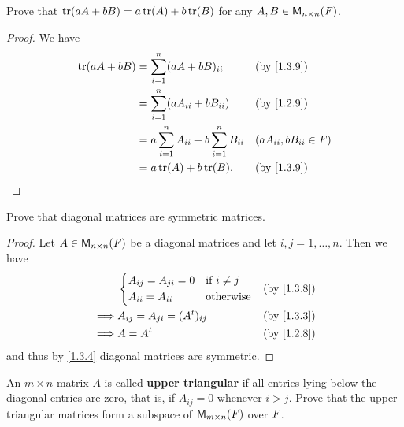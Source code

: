 \begin{ex}\label{ex:1.3.6}
  Prove that \(\tr{aA + bB} = a\tr{A} + b\tr{B}\) for any \(A, B \in \mathsf{M}_{{n} \times n}({\mathit{F}})\).
\end{ex}

\begin{proof}
  We have
  \begin{align*}
    \tr{aA + bB} & = \sum_{i = 1}^n (aA + bB)_{i i}                      &  & \text{(by \cref{1.3.9})}    \\
                 & = \sum_{i = 1}^n (aA_{i i} + bB_{i i})                &  & \text{(by \cref{1.2.9})}    \\
                 & = a \sum_{i = 1}^n A_{i i} + b \sum_{i = 1}^n B_{i i} &  & (aA_{i i}, bB_{i i} \in \F) \\
                 & = a\tr{A} + b\tr{B}.                                  &  & \text{(by \cref{1.3.9})}
  \end{align*}
\end{proof}

\begin{ex}\label{ex:1.3.7}
  Prove that diagonal matrices are symmetric matrices.
\end{ex}

\begin{proof}
  Let \(A \in \mathsf{M}_{{n} \times n}({\mathit{F}})\) be a diagonal matrices and let \(i, j = 1, \dots, n\).
  Then we have
  \begin{align*}
             & \begin{dcases}
      A_{i j} = A_{j i} = 0 & \text{if } i \neq j \\
      A_{i i} = A_{i i}     & \text{otherwise}
    \end{dcases}         &  & \text{(by \cref{1.3.8})} \\
    \implies & A_{i j} = A_{j i} = (\tp{A})_{i j} &  & \text{(by \cref{1.3.3})} \\
    \implies & A = \tp{A}                         &  & \text{(by \cref{1.2.8})}
  \end{align*}
  and thus by \cref{1.3.4} diagonal matrices are symmetric.
\end{proof}

\setcounter{ex}{11}
\begin{ex}\label{ex:1.3.12}
  An \(m \times n\) matrix \(A\) is called \textbf{upper triangular} if all entries lying below the diagonal entries are zero, that is, if \(A_{i j} = 0\) whenever \(i > j\).
  Prove that the upper triangular matrices form a subspace of \(\mathsf{M}_{{m} \times n}({\mathit{F}})\) over \(\mathit{F}\).
\end{ex}

